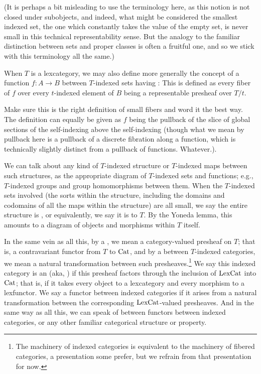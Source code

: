(It is perhaps a bit misleading to use the terminology  here, as this notion is not closed under subobjects, and indeed, what might be considered the smallest indexed set, the one which constantly takes the value of the empty set, is never small in this technical representability sense. But the analogy to the familiar distinction between sets and proper classes is often a fruitful one, and so we stick with this terminology all the same.)

When $T$ is a lexcategory, we may also define more generally the concept of a function $f : A \to B$ between $T$-indexed sets having : This is defined as every fiber of $f$ over every $t$-indexed element of $B$ being a representable presheaf over $T/t$.

\begin{TODOblock}
Make sure this is the right definition of small fibers and word it the best way. The definition can equally be given as $f$ being the pullback of the slice of global sections of the self-indexing above the self-indexing (though what we mean by pullback here is a pullback of a discrete fibration along a function, which is technically slightly distinct from a pullback of functions. Whatever.).
\end{TODOblock}

We can talk about any kind of $T$-indexed structure or $T$-indexed maps between such structures, as the appropriate diagram of $T$-indexed sets and functions; e.g., $T$-indexed groups and group homomorphisms between them. When the $T$-indexed sets involved (the sorts within the structure, including the domains and codomains of all the maps within the structure) are all small, we say the entire structure is , or equivalently, we say it is  to $T$. By the Yoneda lemma, this amounts to a diagram of objects and morphisms within $T$ itself.

In the same vein as all this, by a , we mean a category-valued presheaf on $T$; that is, a contravariant functor from $T$ to $\mathrm{Cat}$, and by a  between $T$-indexed categories, we mean a natural transformation between such presheaves.\footnote{The machinery of indexed categories is equivalent to the machinery of fibered categories, a presentation some prefer, but we refrain from that presentation for now.} We say this indexed category is an  (aka, ) if this presheaf factors through the inclusion of $\mathrm{LexCat}$ into $\mathrm{Cat}$; that is, if it takes every object to a lexcategory and every morphism to a lexfunctor. We say a functor between indexed categories  if it arises from a natural transformation between the corresponding $\mathrm{LexCat}$-valued presheaves. And in the same way as all this, we can speak of  between functors between indexed categories, or any other familiar categorical structure or property.


